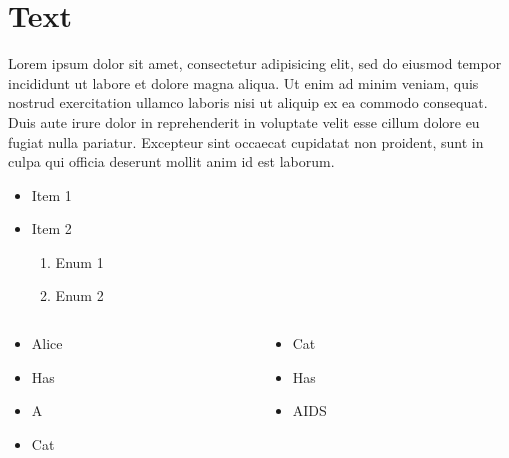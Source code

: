 {
\tableofcontents
}


\section{Text}


{
\begin{multicols}{2}
Lorem ipsum dolor sit amet, consectetur adipisicing elit, sed do eiusmod tempor incididunt ut labore et dolore magna aliqua. Ut enim ad minim veniam, quis nostrud exercitation ullamco laboris nisi ut aliquip ex ea commodo consequat. Duis aute irure dolor in reprehenderit in voluptate velit esse cillum dolore eu fugiat nulla pariatur. Excepteur sint occaecat cupidatat non proident, sunt in culpa qui officia deserunt mollit anim id est laborum.
\end{multicols}
}


{
\begin{itemize}
\item Item 1
\pause

\item Item 2
\begin{enumerate}
\item Enum 1
\item Enum 2
\end{enumerate}
\end{itemize}
}


{
\begin{columns}

\begin{column}{0.45\textwidth}
\begin{itemize}
\item Alice
\item Has
\item A
\item Cat
\end{itemize}
\end{column}

\begin{column}{0.45\textwidth}
\begin{itemize}
\item Cat
\item Has
\item AIDS
\end{itemize}
\end{column}

\end{columns}
}


